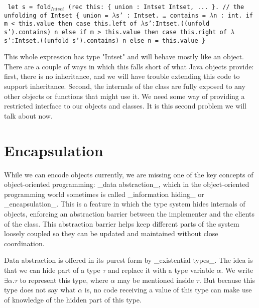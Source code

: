 \begin{small}
\begin{code}
\tt
   let s = fold$_{Intset}$ (rec this: \{ union : Intset \mth{\rightarrow} Intset, ... \}. // the unfolding of Intset
   \{
      union = $\lambda${s'} : Intset. \ldots
      contains = $\lambda${n} : int.
         if m < this.value then case this.left of
            $\lambda${s'}:Intset.((unfold s').contains) n
         else if m > this.value then case this.right of
            $\lambda${s'}:Intset.((unfold s').contains) n
         else n = this.value
   \}
\end{code}
\end{small}

This whole expression has type "Intset" and will behave
mostly like an object. There are a couple of ways in which
this falls short of what Java objects provide: first, there
is no inheritance, and we will have trouble extending this code
to support inheritance. Second, the internals of the class
are fully exposed to any other objects or functions that might
use it. We need some way of providing a restricted interface
to our objects and classes. It is this second problem we
will talk about now.

\section {Encapsulation}

While we can encode objects currently, we are missing one of the key
concepts of object-oriented programming: _data abstraction_, which in the
object-oriented programming world sometimes is called _information hiding_ or _encapsulation_.
This is a feature in which the type system hides internals of objects, enforcing an
abstraction barrier between the implementer and the clients of the
class. This abstraction barrier helps keep different parts of the system
loosely coupled so they can be updated and maintained without close
coordination.

Data abstraction is offered in its purest form by _existential types_.
The idea is that we can hide part of a type $\tau$ and
replace it with a type variable $\alpha$. We write $\exists \alpha.\tau$
to represent this type, where $\alpha$ may be mentioned inside
$\tau$. But because this type does not say what $\alpha$ is, no
code receiving a value of this type can make use of
knowledge of the hidden part of this type.

